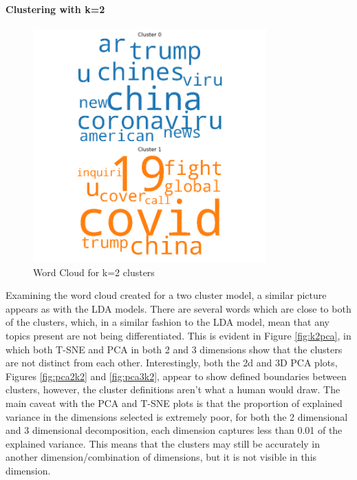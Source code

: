 \paragraph{Clustering with k=2}
\begin{figure}[H]
	\centering
	\includegraphics[width=0.8\textwidth]{images/kmeans_word_cloud_k=2.png}
	\caption{Word Cloud for k=2 clusters}
	\label{fig:wck2}
\end{figure}
Examining the word cloud created for a two cluster model, a similar picture appears as with the LDA models. There are several words which are close to both of the clusters, which, in a similar fashion to the LDA model, mean that any topics present are not being differentiated. This is evident in Figure \ref{fig:k2pca}, in which both T-SNE and PCA in both 2 and 3 dimensions show that the clusters are not distinct from each other. Interestingly, both the 2d and 3D PCA plots, Figures \ref{fig:pca2k2} and \ref{fig:pca3k2}, appear to show defined boundaries between clusters, however, the cluster definitions aren't what a human would draw. The main caveat with the PCA and T-SNE plots is that the proportion of explained variance in the dimensions selected is extremely poor, for both the 2 dimensional and 3 dimensional decomposition, each dimension captures less than 0.01 of the explained variance. This means that the clusters may still be accurately in another dimension/combination of dimensions, but it is not visible in this dimension. 

